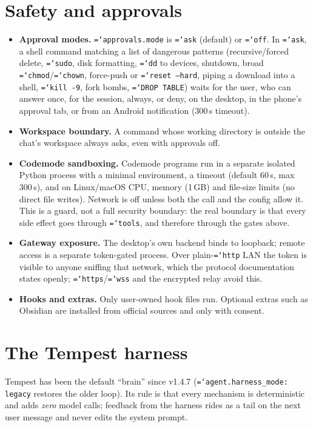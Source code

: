 \documentclass[11pt]{article}
\newcommand{\code}[1]{\texttt{\hyphenchar\font=`\-\relax #1}}
\begin{document}
\section{Safety and approvals}
\label{sec:safety}
\begin{itemize}
\item \textbf{Approval modes.} \code{approvals.mode} is \code{ask} (default) or \code{off}. In \code{ask}, a shell command matching a list of dangerous patterns
  (recursive/forced delete, \code{sudo}, disk formatting, \code{dd} to devices, shutdown, broad \code{chmod}/\code{chown}, force-push or \code{reset --hard},
  piping a download into a shell, \code{kill -9}, fork bombs, \code{DROP TABLE}) waits for the user, who can answer once, for the session, always, or deny,
  on the desktop, in the phone's approval tab, or from an Android notification (300\,s timeout).
\item \textbf{Workspace boundary.} A command whose working directory is outside the chat's workspace always asks, even with approvals off.
\item \textbf{Codemode sandboxing.} Codemode programs run in a separate isolated Python process with a minimal environment, a timeout (default 60\,s, max 300\,s),
  and on Linux/macOS CPU, memory (1\,GB) and file-size limits (no direct file writes). Network is off unless both the call and the config allow it. This is a guard, not a full
  security boundary: the real boundary is that every side effect goes through \code{tools}, and therefore through the gates above.
\item \textbf{Gateway exposure.} The desktop's own backend binds to loopback; remote access is a separate token-gated process. Over plain-\code{http} LAN the token
  is visible to anyone sniffing that network, which the protocol documentation states openly; \code{https}/\code{wss} and the encrypted relay avoid this.
\item \textbf{Hooks and extras.} Only user-owned hook files run. Optional extras such as Obsidian are installed from official sources and only with consent.
\end{itemize}

\section{The Tempest harness}
\label{sec:tempest}

Tempest has been the default ``brain'' since v1.4.7 (\code{agent.harness\_mode: legacy} restores the older loop). Its rule is that every mechanism is
deterministic and adds \emph{zero} model calls; feedback from the harness rides as a tail on the next user message and never edits the system prompt.
\end{document}
